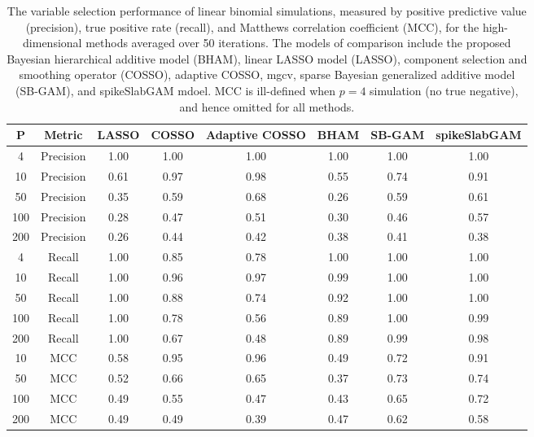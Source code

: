 \begin{table}[ht]
\centering
\begin{tabular}{cccccccc}
  \hline
P & Metric & LASSO & COSSO & Adaptive COSSO & BHAM & SB-GAM & spikeSlabGAM \\ 
  \hline
  4 & Precision & 1.00 & 1.00 & 1.00 & 1.00 & 1.00 & 1.00 \\ 
   10 & Precision & 0.61 & 0.97 & 0.98 & 0.55 & 0.74 & 0.91 \\ 
   50 & Precision & 0.35 & 0.59 & 0.68 & 0.26 & 0.59 & 0.61 \\ 
  100 & Precision & 0.28 & 0.47 & 0.51 & 0.30 & 0.46 & 0.57 \\ 
  200 & Precision & 0.26 & 0.44 & 0.42 & 0.38 & 0.41 & 0.38 \\ 
    4 & Recall & 1.00 & 0.85 & 0.78 & 1.00 & 1.00 & 1.00 \\ 
   10 & Recall & 1.00 & 0.96 & 0.97 & 0.99 & 1.00 & 1.00 \\ 
   50 & Recall & 1.00 & 0.88 & 0.74 & 0.92 & 1.00 & 1.00 \\ 
  100 & Recall & 1.00 & 0.78 & 0.56 & 0.89 & 1.00 & 0.99 \\ 
  200 & Recall & 1.00 & 0.67 & 0.48 & 0.89 & 0.99 & 0.98 \\ 
   10 & MCC & 0.58 & 0.95 & 0.96 & 0.49 & 0.72 & 0.91 \\ 
   50 & MCC & 0.52 & 0.66 & 0.65 & 0.37 & 0.73 & 0.74 \\ 
  100 & MCC & 0.49 & 0.55 & 0.47 & 0.43 & 0.65 & 0.72 \\ 
  200 & MCC & 0.49 & 0.49 & 0.39 & 0.47 & 0.62 & 0.58 \\ 
   \hline
\end{tabular}
\caption{The variable selection performance of linear binomial simulations, measured by positive predictive value (precision), true positive rate (recall), and Matthews correlation coefficient (MCC), for the high-dimensional methods averaged over 50 iterations. The models of comparison include the proposed Bayesian hierarchical additive model (BHAM), linear LASSO model (LASSO), component selection and smoothing operator (COSSO), adaptive COSSO, mgcv, sparse Bayesian generalized additive model (SB-GAM), and spikeSlabGAM mdoel. MCC is ill-defined when $p=4$ simulation (no true negative), and hence omitted for all methods.} 
\label{tab:sim_lnr_binom_var_select}
\end{table}
